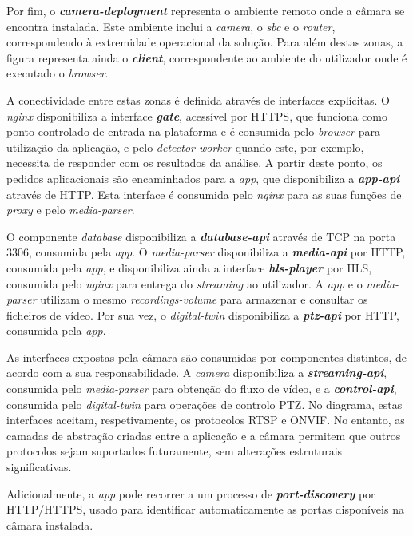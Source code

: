 Por fim, o \textbf{\textit{camera-deployment}} representa o ambiente remoto onde a câmara se encontra instalada. Este ambiente inclui a \textit{camera}, o \textit{sbc} e o \textit{router}, correspondendo à extremidade operacional da solução. Para além destas zonas, a figura representa ainda o \textbf{\textit{client}}, correspondente ao ambiente do utilizador onde é executado o \textit{browser}.

A conectividade entre estas zonas é definida através de interfaces explícitas. O \textit{nginx} disponibiliza a interface \textbf{\textit{gate}}, acessível por \gls{HTTPS}, que funciona como ponto controlado de entrada na plataforma e é consumida pelo \textit{browser} para utilização da aplicação, e pelo \textit{detector-worker} quando este, por exemplo, necessita de responder com os resultados da análise. A partir deste ponto, os pedidos aplicacionais são encaminhados para a \textit{app}, que disponibiliza a \textbf{\textit{app-api}} através de \gls{HTTP}. Esta interface é consumida pelo \textit{nginx} para as suas funções de \textit{proxy} e pelo \textit{media-parser}.

O componente \textit{database} disponibiliza a \textbf{\textit{database-api}} através de \gls{TCP} na porta 3306, consumida pela \textit{app}. O \textit{media-parser} disponibiliza a \textbf{\textit{media-api}} por \gls{HTTP}, consumida pela \textit{app}, e disponibiliza ainda a interface \textbf{\textit{hls-player}} por \gls{HLS}, consumida pelo \textit{nginx} para entrega do \textit{streaming} ao utilizador. A \textit{app} e o \textit{media-parser} utilizam o mesmo \textit{recordings-volume} para armazenar e consultar os ficheiros de vídeo. Por sua vez, o \textit{digital-twin} disponibiliza a \textbf{\textit{ptz-api}} por \gls{HTTP}, consumida pela \textit{app}.

As interfaces expostas pela câmara são consumidas por componentes distintos, de acordo com a sua responsabilidade. A \textit{camera} disponibiliza a \textbf{\textit{streaming-api}}, consumida pelo \textit{media-parser} para obtenção do fluxo de vídeo, e a \textbf{\textit{control-api}}, consumida pelo \textit{digital-twin} para operações de controlo \gls{PTZ}. No diagrama, estas interfaces aceitam, respetivamente, os protocolos \gls{RTSP} e \gls{ONVIF}. No entanto, as camadas de abstração criadas entre a aplicação e a câmara permitem que outros protocolos sejam suportados futuramente, sem alterações estruturais significativas.

Adicionalmente, a \textit{app} pode recorrer a um processo de \textbf{\textit{port-discovery}} por \gls{HTTP}/\gls{HTTPS}, usado para identificar automaticamente as portas disponíveis na câmara instalada.

